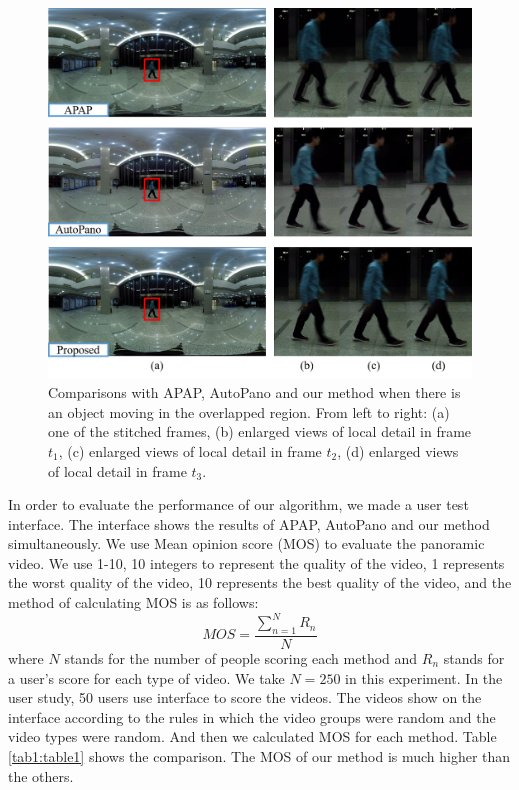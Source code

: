 \documentclass[conference]{IEEEtran}
\begin{document}
\begin{figure}[!htpb]
\centering
\includegraphics[scale=0.36]{picture36.png}
\caption{Comparisons with APAP, AutoPano and our method when there is an object moving in the overlapped region. From left to right: (a) one of the stitched frames, (b) enlarged views of local
detail in frame $t_1$, (c) enlarged views of local detail in frame $t_2$, (d) enlarged views of local detail in frame $t_3$.}
\label{fig:pic15}
\end{figure}

In order to evaluate the performance of our algorithm, we made a user test interface. The interface shows the results of APAP, AutoPano and our method simultaneously.
We use Mean opinion score (MOS) to evaluate the panoramic video. We use 1-10, 10 integers to represent the quality of the video, 
1 represents the worst quality of the video, 10 represents the best quality of the video, and the method of calculating MOS is as follows:
$$MOS=\frac{\sum^{N}_{n=1}{R_n}}{N}$$
where $N$ stands for the number of people scoring each method and $R_n$ stands for a user's score for each type of video. We take $N=250$ in this experiment.
In the user study, 50 users use interface to score the videos. The videos show on the interface according to the rules in which the video groups were random and the video types were random.
And then we calculated MOS for each method. Table \ref{tab1:table1} shows the comparison. The MOS of our method is much higher than the others.
\end{document}
